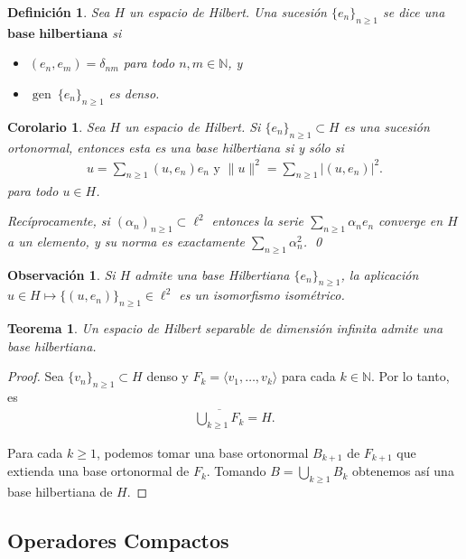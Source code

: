 \documentclass[11pt]{report}
\theoremstyle{colored}
\newtheorem{definition}{Definición}[section]
\newtheorem{theorem}{Teorema}[section]
\newtheorem{corollary}{Corolario}[section]
\newtheorem{remark}{Observación}[section]
\newcommand{\N}{\mathbb{N}}
\newcommand{\ip}[1]{( #1 )}
\newcommand{\paint}[1]{\color{color}{#1}}
\begin{document}
\begin{definition} Sea $H$ un espacio de Hilbert. Una sucesión $\{e_n\}_{n \geq 1}$ se dice una $\textbf{base hilbertiana}$ si
\begin{itemize}
\item[$\paint{\bullet}$] $\ip{e_n,e_m} = \delta_{nm}$ para todo $n,m \in \N$, y
\item[$\paint{\bullet}$] $\operatorname{gen} \ \{e_n\}_{n \geq 1}$ es denso.
\end{itemize}
\end{definition}

\begin{corollary} Sea $H$ un espacio de Hilbert. Si $\{e_n\}_{n \geq 1} \subset H$ es una sucesión ortonormal, entonces esta es una base hilbertiana si y sólo si 
\begin{align*}
u = \sum_{n \geq 1}(u,e_n)e_n \text{ y } \|u\|^2 = \sum_{n \geq 1}|(u,e_n)|^2.
\end{align*}
para todo $u \in H$.

Recíprocamente, si $(\alpha_n)_{n \geq 1} \subset \ell^2$ entonces la serie $\sum_{n \geq 1}\alpha_n e_n$ converge en $H$ a un elemento, y su norma es exactamente $\sum_{n \geq 1}\alpha_n^2$. \qed
\end{corollary}

\begin{remark} Si $H$ admite una base Hilbertiana $\{e_n\}_{n \geq 1}$, la aplicación $u \in H \mapsto \{(u,e_n)\}_{n \geq 1} \in \ell^2$ es un isomorfismo isométrico.
\end{remark}

\begin{theorem} Un espacio de Hilbert separable de dimensión infinita admite una base hilbertiana.
\end{theorem}
\begin{proof} Sea $\{v_n\}_{n \geq 1} \subset H$ denso y $F_k = \langle v_1, \dots, v_k \rangle$ para cada $k \in \N$. Por lo tanto, es
\begin{align*}
\overline{\bigcup_{k \geq 1}F_k} = H.
\end{align*}

Para cada $k \geq 1$, podemos tomar una base ortonormal $B_{k+1}$ de $F_{k+1}$ que extienda una base ortonormal de $F_k$. Tomando $B = \bigcup_{k \geq 1}B_k$ obtenemos así una base hilbertiana de $H$.
\end{proof}

\subsection{Operadores Compactos}
\end{document}
